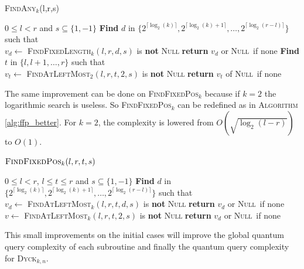 \documentclass[11pt,a4paper]{article}
\newcommand{\Dyck}[1]{\textsc{Dyck$_{#1}$}}
\newcommand{\FA}[1]{\textsc{FindAny$_{#1}$}}
\newcommand{\FFL}[1]{\textsc{FindFixedLength$_{#1}$}}
\newcommand{\FFP}[1]{\textsc{FindFixedPos$_{#1}$}}
\newcommand{\FALM}[1]{\textsc{FindAtLeftMost$_{#1}$}}
\newcommand{\Null}{\textsc{Null}}
\theoremstyle{definition}
\theoremstyle{plain}
\theoremstyle{definition}
\begin{document}
\begin{algorithm}
    \caption{\FA{k}(l,r,s)}\label{alg:FA_prim}
    \begin{algorithmic}
        \Require $0 \leq l < r$ and $s \subseteq \{1,-1\}$
        \State \textbf{Find} $d$ in $\{2^{\lceil \log_2(k)\rceil }, 2^{\lceil \log_2(k)+1\rceil },\ldots,2^{\lceil \log_2(r-l)\rceil }\}$
        such that \\
        \hspace*{1cm} $v_d \gets $ \FFL{k}$(l,r,d,s)$ is \textbf{not} \Null
        \State \textbf{return} $v_d$ or \Null \ if none
        \Else
        \State \textbf{Find} $t$ in $\{l, l+1, \dots, r\}$ such that \\
        \hspace*{1cm} $v_t \gets$ \FALM{2}$(l,r,t,2,s)$ is \textbf{not} \Null
        \State \textbf{return} $v_t$ of \Null \ if none
        \EndIf
    \end{algorithmic}
\end{algorithm}

The same improvement can be done on \FFP{k} because if $k = 2$ the logarithmic
search is useless. So \FFP{k} can be redefined as in \textsc{Algorithm} \autoref{alg:ffp_better}.
For $k=2$, the complexity is lowered from $O(\sqrt{\log_2(l-r)})$ to $O(1)$.

\begin{algorithm}
    \caption{$\FFP{k}(l,r,t,s)$}\label{alg:ffp_better}
    \begin{algorithmic}
        \Require $0\leq l<r$, $l \leq t \leq r$ and $s \subseteq \{1, -1\}$
        \State \textbf{Find} $d$ in $\{2^{\lceil \log_2(k)\rceil }, 2^{\lceil \log_2(k)+1\rceil },\ldots,2^{\lceil \log_2(r-l)\rceil }\}$
        such that \\
        \hspace*{1cm} $v_d \gets $ \FALM{k}$(l,r,t,d,s)$ is \textbf{not} \Null
        \State \textbf{return} $v_d$ or \Null \ if none
        \Else
        \ $v \gets $ \FALM{k}$(l,r,t,2,s)$ is \textbf{not} \Null
        \State \textbf{return} $v_d$ or \Null \ if none
        \EndIf
    \end{algorithmic}
\end{algorithm}

This small improvements on the initial cases will improve the global
quantum query complexity of each subroutine and finally the quantum
query complexity for \Dyck{k,n}.

\newpage
\end{document}
